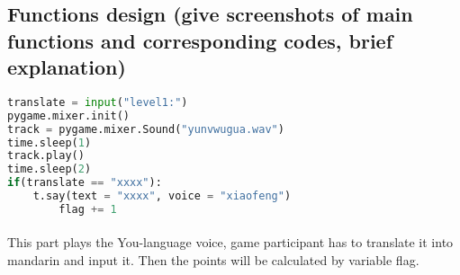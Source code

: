 \documentclass{article}
\begin{document}
	\subsection{Functions design (give screenshots of main functions and corresponding codes, brief explanation)}
		\begin{lstlisting}[language=Python]
translate = input("level1:")
pygame.mixer.init()
track = pygame.mixer.Sound("yunvwugua.wav")
time.sleep(1)
track.play()
time.sleep(2)
if(translate == "xxxx"):
	t.say(text = "xxxx", voice = "xiaofeng")
        flag += 1
		\end{lstlisting}
		\paragraph{}This part plays the You-language voice, game participant has to translate it into mandarin and input it. Then the points will be calculated by variable flag. 
\end{document}
